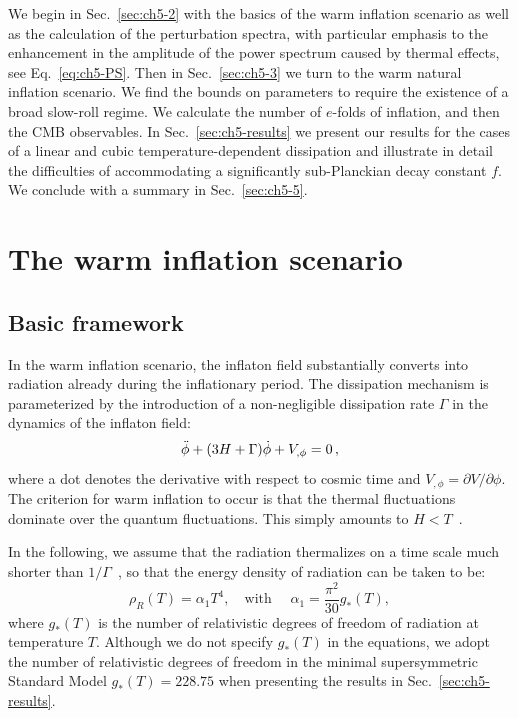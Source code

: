 We begin in Sec.~\ref{sec:ch5-2} with the basics of the warm inflation scenario as well as the calculation of the perturbation spectra, with particular emphasis to the enhancement in the amplitude of the power spectrum caused by thermal effects, see Eq.~\ref{eq:ch5-PS}. Then in Sec.~\ref{sec:ch5-3} we turn to the warm natural inflation scenario. We find the bounds on parameters to require the existence of a broad slow-roll regime. We calculate the number of $e$-folds of inflation, and then the CMB observables. In Sec.~\ref{sec:ch5-results} we present our results for the cases of a linear and cubic temperature-dependent dissipation and illustrate in detail the difficulties of accommodating a significantly sub-Planckian decay constant $f$. We conclude with a summary in Sec.~\ref{sec:ch5-5}.

\section{The warm inflation scenario
\label{sec:ch5-2}}
\subsection{Basic framework}

In the warm inflation scenario, the inflaton field substantially converts into radiation already during the inflationary period. The dissipation mechanism is parameterized by the introduction of a non-negligible dissipation rate $\Gamma$ in the dynamics of the inflaton field:
\begin{equation}
    \Ddot{\phi}+(3H+\Gamma)\dot{\phi}+V_{,\phi}=0\,,
    \label{eq:ch5-2.1}
\end{equation}
where a dot denotes the derivative with respect to cosmic time and $V_{,\phi}=\partial V/\partial \phi$. The criterion for warm inflation to occur is that the thermal fluctuations dominate over the quantum fluctuations. This simply amounts to $H<T$~\cite{Berera:1995ie}.

In the following, we assume that the radiation thermalizes on a time scale much shorter than $1/\Gamma$~\cite{Berera:1995wh,Berera:1995ie}, so that the energy density of radiation can be taken to be:
\begin{equation}
    \rho_R(T)=\alpha_1 T^4, \quad \text{with } \quad \alpha_1=\frac{\pi^2}{30}g_{*}(T), \label{eq:ch5-2.2}
\end{equation}
where $g_{*}(T)$ is the number of relativistic degrees of freedom of radiation at temperature $T$. Although we do not specify $g_{*}(T)$ in the equations, we adopt the number of relativistic degrees of freedom in the minimal supersymmetric Standard Model $g_{*}(T) = 228.75$ when presenting the results in Sec.~\ref{sec:ch5-results}.

